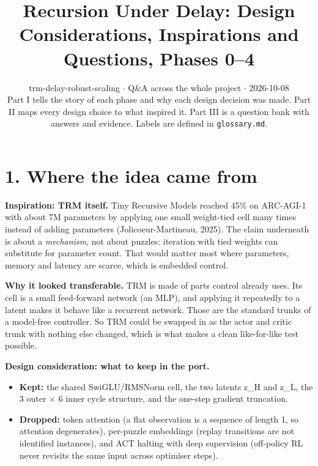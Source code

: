\documentclass[11pt]{article}
\title{Recursion Under Delay: Design Considerations, Inspirations and Questions, Phases 0--4}
\author{}
\date{trm-delay-robust-scaling $\cdot$ Q\&A across the whole project $\cdot$ 2026-10-08\\[2pt]Part I tells the story of each phase and why each design decision was made. Part II maps every design choice to what inspired it. Part III is a question bank with answers and evidence. Labels are defined in \texttt{glossary.md}.}
\begin{document}
\maketitle
\tableofcontents
\clearpage



\medskip{}



\section*{1. Where the idea came from}



\textbf{Inspiration: TRM itself.} Tiny Recursive Models reached 45\% on ARC-AGI-1 with about 7M parameters by applying one small weight-tied cell many times instead of adding parameters (Jolicoeur-Martineau, 2025). The claim underneath is about a \emph{mechanism}, not about puzzles: iteration with tied weights can substitute for parameter count. That would matter most where parameters, memory and latency are scarce, which is embedded control.



\textbf{Why it looked transferable.} TRM is made of parts control already uses. Its cell is a small feed-forward network (an MLP), and applying it repeatedly to a latent makes it behave like a recurrent network. Those are the standard trunks of a model-free controller. So TRM could be swapped in as the actor and critic trunk with nothing else changed, which is what makes a clean like-for-like test possible.



\textbf{Design consideration: what to keep in the port.}

\begin{itemize}
\item \textbf{Kept:} the shared SwiGLU/RMSNorm cell, the two latents z\_H and z\_L, the 3 outer $\times$ 6 inner cycle structure, and the one-step gradient truncation.
\item \textbf{Dropped:} token attention (a flat observation is a sequence of length 1, so attention degenerates), per-puzzle embeddings (replay transitions are not identified instances), and ACT halting with deep supervision (off-policy RL never revisits the same input across optimiser steps).
\end{itemize}
\end{document}
